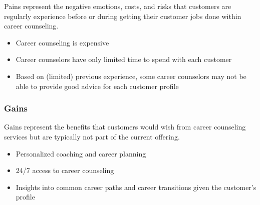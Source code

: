 Pains represent the negative emotions, costs, and risks that customers are regularly experience before
or during getting their customer jobs done within career counseling.

\begin{itemize}
    \item Career counseling is expensive
    \item Career counselors have only limited time to spend with each customer
    \item Based on (limited) previous experience, some career counselors may not be able to provide
        good advice for each customer profile
\end{itemize}

\subsubsection{Gains}

Gains represent the benefits that customers would wish from career counseling services but are 
typically not part of the current offering.

\begin{itemize}
    \item Personalized coaching and career planning
    \item 24/7 access to career counseling
    \item Insights into common career paths and career transitions given the customer's profile
\end{itemize}
